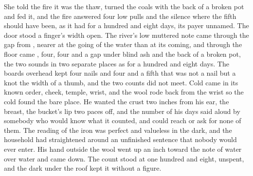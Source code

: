 She told the fire it was the thaw, turned the coals with the back of a broken pot and fed it, and the fire answered four low pulls and the silence where the fifth should have been, as it had for a hundred and eight days, its payer unnamed. The door stood a finger's width open. The river's low muttered note came through the gap from , nearer at the going of the water than at its coming, and through the floor came , four, four and a gap under blind ash and the back of a broken pot, the two sounds in two separate places as for a hundred and eight days. The boards overhead kept four nails and four and a fifth that was not a nail but a knot the width of a thumb, and the two counts did not meet. Cold came in its known order, cheek, temple, wrist, and the wool rode back from the wrist so the cold found the bare place. He wanted the crust two inches from his ear, the breast, the bucket's lip two paces off, and the number of his days said aloud by somebody who would know what it counted, and could reach or ask for none of them. The reading of the iron was perfect and valueless in the dark, and the household had straightened around an unfinished sentence that nobody would ever enter. His hand outside the wool went up an inch toward the note of water over water and came down. The count stood at one hundred and eight, unspent, and the dark under the roof kept it without a figure.

